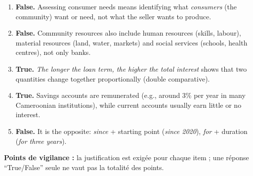 \documentclass[11pt]{article}
\newcommand{\cle}[1]{{\popxbold\color{popdark}#1}}
\begin{document}
\begin{corrige}
\begin{enumerate}
    \item \textbf{False.} Assessing \cle{consumer needs} means identifying what \emph{consumers} (the community) want or need, not what the seller wants to produce.
    \item \textbf{False.} \cle{Community resources} also include human resources (skills, labour), material resources (land, water, markets) and social services (schools, health centres), not only banks.
    \item \textbf{True.} \emph{The longer the loan term, the higher the total interest} shows that two quantities change together proportionally (\cle{double comparative}).
    \item \textbf{True.} \cle{Savings accounts} are remunerated (e.g., around 3\% per year in many Cameroonian institutions), while \cle{current accounts} usually earn little or no interest.
    \item \textbf{False.} It is the opposite: \emph{since} + starting point (\emph{since 2020}), \emph{for} + duration (\emph{for three years}).
\end{enumerate}
\textbf{Points de vigilance :} la justification est exigée pour chaque item ; une réponse ``True/False'' seule ne vaut pas la totalité des points.
\end{corrige}
\end{document}
